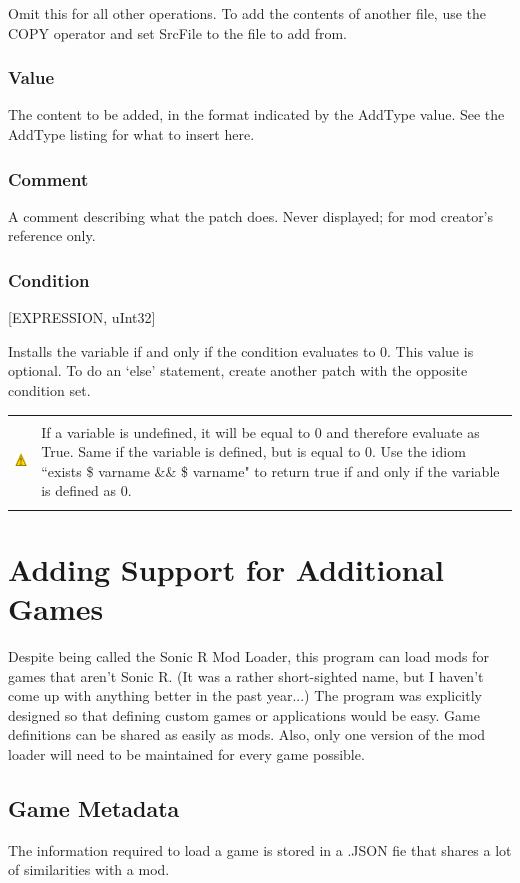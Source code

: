 \documentclass[12pt,a4paper,notitlepage]{article}
\newcommand{\warning}[1]{
    \begin{tabular}{m{1.1cm}  m{11cm}}
    &\\
    \includegraphics[width=1.1cm, height=1.1cm]{warning} & #1
    \\&\\
    \end{tabular}
}
\begin{document}
Omit this for all other operations. To add the contents of another file, use the COPY operator and set SrcFile to the file to add from.

\subsubsection{Value}
The content to be added, in the format indicated by the AddType value. See the AddType listing for what to insert here.

\subsubsection{Comment}
A comment describing what the patch does. Never displayed; for mod creator's reference only.

\subsubsection{Condition}
[EXPRESSION, uInt32]

Installs the variable if and only if the condition evaluates to 0. This value is optional. To do an `else' statement, create another patch with the opposite condition set.

\warning{If a variable is undefined, it will be equal to 0 and therefore evaluate as True. Same if the variable is defined, but is equal to 0. Use the idiom ``exists \$ varname \&\& \$ varname" to return true if and only if the variable is defined as 0.}

\pagebreak
\section{Adding Support for Additional Games}
\label{sec:games}
Despite being called the Sonic R Mod Loader, this program can load mods for games that aren't Sonic R. (It was a rather short-sighted name, but I haven't come up with anything better in the past year...) The program was explicitly designed so that defining custom games or applications would be easy. Game definitions can be shared as easily as mods. Also, only one version of the mod loader will need to be maintained for every game possible.

\subsection{Game Metadata}
\label{subsec:games-meta}
The information required to load a game is stored in a .JSON fie that shares a lot of similarities with a mod.
\end{document}
